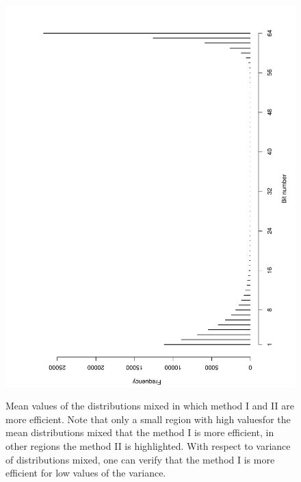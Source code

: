 \documentclass[10pt]{article}
\begin{document}
\begin{figure}[h]
{  \includegraphics[scale=0.4]{fig17}
  \label{fig17}
  }
  \caption{Mean values ​​of the distributions mixed in which method I and II are more efficient. Note that only a small region with high values ​​for the mean distributions mixed that the method  I is more efficient, in other regions the method II is highlighted. With respect to variance of distributions mixed, one can verify that the method I is more efficient for low values ​​of the variance.}
  \label{fig:1617}
\end{figure}
\end{document}
